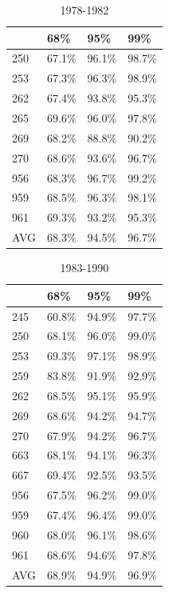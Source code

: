 \documentclass[12pt]{article}
\begin{document}
\begin{table}[h!]
\centering
\begin{tabular}[c]{@{}llll@{}}
\hline
& 68\% & 95\% & 99\% \\ \hline
250 & 67.1\% & 96.1\% & 98.7\% \\
253 & 67.3\% & 96.3\% & 98.9\% \\ 
262 & 67.4\% & 93.8\% & 95.3\% \\
265 & 69.6\% & 96.0\% & 97.8\% \\
269 & 68.2\% & 88.8\% & 90.2\% \\
270 & 68.6\% & 93.6\% & 96.7\% \\
956 & 68.3\% & 96.7\% & 99.2\% \\
959 & 68.5\% & 96.3\% & 98.1\% \\
961 & 69.3\% & 93.2\% & 95.3\% \\
AVG & 68.3\% & 94.5\% & 96.7\% \\ \hline
\end{tabular}
\caption{1978-1982}
\label{predTab78}
\end{table}

\begin{table}[h!]
\centering
\begin{tabular}[c]{@{}llll@{}}
\hline
& 68\% & 95\% & 99\% \\ \hline
245 & 60.8\% & 94.9\% & 97.7\% \\  
250 & 68.1\% & 96.0\% & 99.0\% \\
253 & 69.3\% & 97.1\% & 98.9\% \\
259 & 83.8\% & 91.9\% & 92.9\% \\
262 & 68.5\% & 95.1\% & 95.9\% \\
269 & 68.6\% & 94.2\% & 94.7\% \\
270 & 67.9\% & 94.2\% & 96.7\% \\
663 & 68.1\% & 94.1\% & 96.3\% \\
667 & 69.4\% & 92.5\% & 93.5\% \\
956 & 67.5\% & 96.2\% & 99.0\% \\
959 & 67.4\% & 96.4\% & 99.0\% \\
960 & 68.0\% & 96.1\% & 98.6\% \\
961 & 68.6\% & 94.6\% & 97.8\% \\
AVG & 68.9\% & 94.9\% & 96.9\% \\ \hline
\end{tabular}
\caption{1983-1990}
\label{predTab83}
\end{table}
\end{document}
